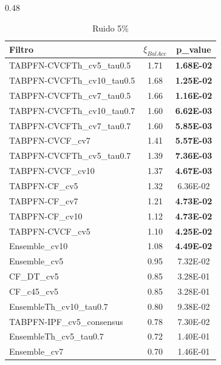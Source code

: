 \documentclass[print, color]{ugrTFG}
\begin{document}
\begin{table}[h!]
\centering
\caption{Top 20 filtros por nivel de ruido}
\label{tab:top10_wilcox}

\hspace{-1.5cm}
\begin{subtable}{0.48\textwidth}
\centering
\caption{Ruido 5\%}
\begin{tabular}{lcc}
\toprule
Filtro & $\xi_{BalAcc}$ & p\_value \\
\midrule
TABPFN-CVCFTh\_cv5\_tau0.5 & 1.71 & \textbf{1.68E-02} \\
TABPFN-CVCFTh\_cv10\_tau0.5 & 1.68 & \textbf{1.25E-02} \\
TABPFN-CVCFTh\_cv7\_tau0.5 & 1.66 & \textbf{1.16E-02} \\
TABPFN-CVCFTh\_cv10\_tau0.7 & 1.60 & \textbf{6.62E-03} \\
TABPFN-CVCFTh\_cv7\_tau0.7 & 1.60 & \textbf{5.85E-03} \\
TABPFN-CVCF\_cv7 & 1.41 & \textbf{5.57E-03} \\
TABPFN-CVCFTh\_cv5\_tau0.7 & 1.39 & \textbf{7.36E-03} \\
TABPFN-CVCF\_cv10 & 1.37 & \textbf{4.67E-03} \\
TABPFN-CF\_cv5 & 1.32 & 6.36E-02 \\
TABPFN-CF\_cv7 & 1.21 & \textbf{4.73E-02} \\
TABPFN-CF\_cv10 & 1.12 & \textbf{4.73E-02} \\
TABPFN-CVCF\_cv5 & 1.10 & \textbf{4.25E-02} \\
Ensemble\_cv10 & 1.08 & \textbf{4.49E-02} \\
Ensemble\_cv5 & 0.95 & 7.32E-02 \\
CF\_DT\_cv5 & 0.85 & 3.28E-01 \\
CF\_c45\_cv5 & 0.85 & 3.28E-01 \\
EnsembleTh\_cv10\_tau0.7 & 0.80 & 9.38E-02 \\
TABPFN-IPF\_cv5\_consensus & 0.78 & 7.30E-02 \\
EnsembleTh\_cv5\_tau0.7 & 0.72 & 1.40E-01 \\
Ensemble\_cv7 & 0.70 & 1.46E-01 \\
\bottomrule
\end{tabular}


\end{subtable}
\end{table}
\end{document}
